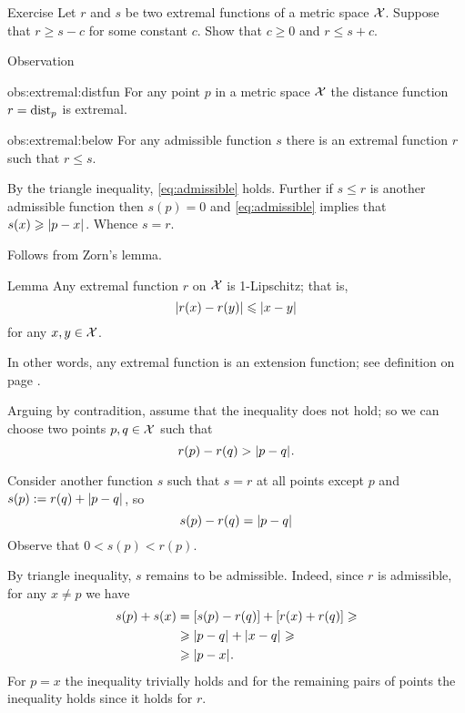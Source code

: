 \begin{thm}{Exercise}\label{ex:+-c}
Let $r$ and $s$ be two extremal functions of a metric space $\mathcal{X}$.
Suppose that $r\ge s-c$ for some constant $c$.
Show that $c\ge 0$ and $r\le s+c$.
\end{thm}


\begin{thm}{Observation}\label{obs:extremal}
\begin{subthm}{obs:extremal:distfun}
For any point $p$ in a metric space $\mathcal{X}$
the distance function $r\z=\distfun_p$ is extremal.
\end{subthm}

\begin{subthm}{obs:extremal:below}
For any admissible function $s$ there is an extremal function $r$ such that $r\le s$.
\end{subthm}

\end{thm}

By the triangle inequality, \ref{eq:admissible} holds.
Further if $s\le r$ is another admissible function then $s(p)=0$ and \ref{eq:admissible} implies that $s(x)\z\ge\dist{p}{x}{}$.
Whence $s=r$.

Follows from Zorn's lemma. 
\qeds

\begin{thm}{Lemma}\label{lem:extremal-lipschitz}
Any extremal function $r$ on $\mathcal{X}$ is 1-Lipschitz;
that is,
\[|r(x)-r(y)|\le \dist{x}{y}{}\]
for any $x,y\in\mathcal{X}$.

In other words, any extremal function is an extension function; see definition on page \pageref{page:extension function}.
\end{thm}

Arguing by contradition, assume that the inequality does not hold;
so we can choose two points $p,q\in \mathcal{X}$
such that 
\[r(p)- r(q)>\dist{p}{q}{}.\]

Consider another function $s$ such that $s=r$ at all points except $p$ and $s(p)\df r(q)+\dist{p}{q}{}$,
so 
\[s(p)- r(q)=\dist{p}{q}{}\]
Observe that $0< s(p)<r(p)$.

By triangle inequality, $s$ remains to be admissible.
Indeed, since $r$ is admissible, for any $x\ne p$ we have
\begin{align*}
s(p)+s(x)&=[s(p)-r(q)]+[r(x)+r(q)]\ge
\\
&\ge \dist{p}{q}{}+\dist{x}{q}{}\ge
\\
&\ge \dist{p}{x}{}.
\end{align*}
For $p=x$ the inequality trivially holds and 
for the remaining pairs of points the inequality holds since it holds for $r$.
\qeds

